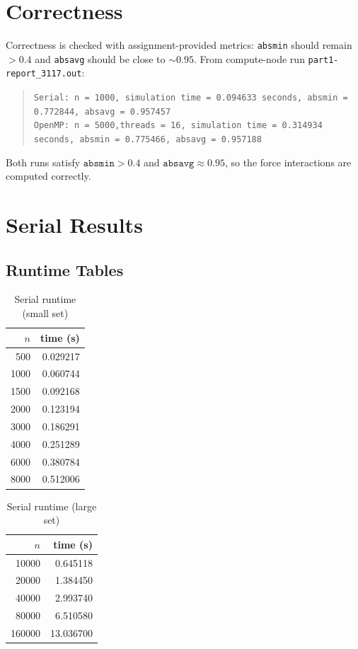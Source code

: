 \documentclass[11pt]{article}
\begin{document}
\section{Correctness}
Correctness is checked with assignment-provided metrics:
\texttt{absmin} should remain \(> 0.4\) and \texttt{absavg} should be close to
\(\sim 0.95\). From compute-node run \texttt{part1-report\_3117.out}:
\begin{quote}
\texttt{Serial: n = 1000, simulation time = 0.094633 seconds, absmin = 0.772844, absavg = 0.957457}\\
\texttt{OpenMP: n = 5000,threads = 16, simulation time = 0.314934 seconds, absmin = 0.775466, absavg = 0.957188}
\end{quote}
Both runs satisfy \(\texttt{absmin} > 0.4\) and \(\texttt{absavg} \approx 0.95\), so
the force interactions are computed correctly.

\section{Serial Results}
\subsection{Runtime Tables}
\begin{table}[h]
\centering
\caption{Serial runtime (small set)}
\begin{tabular}{rr}
\toprule
\(n\) & time (s) \\
\midrule
500 & 0.029217 \\
1000 & 0.060744 \\
1500 & 0.092168 \\
2000 & 0.123194 \\
3000 & 0.186291 \\
4000 & 0.251289 \\
6000 & 0.380784 \\
8000 & 0.512006 \\
\bottomrule
\end{tabular}
\end{table}

\begin{table}[h]
\centering
\caption{Serial runtime (large set)}
\begin{tabular}{rr}
\toprule
\(n\) & time (s) \\
\midrule
10000 & 0.645118 \\
20000 & 1.384450 \\
40000 & 2.993740 \\
80000 & 6.510580 \\
160000 & 13.036700 \\
\bottomrule
\end{tabular}
\end{table}
\end{document}
